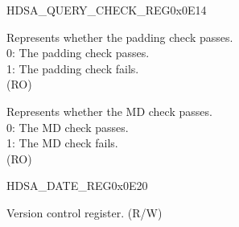 \begin{register}{H}{DSA\_QUERY\_CHECK\_REG}{0x0E14}\label{regdesc:DSAQUERYCHECKREG}
%
%
%
\regnewline%
\begin{regdesc}\begin{reglist}
\item [DSA\_PADDING\_BAD] Represents whether the padding check passes.\\
0: The padding check passes.\\
1: The padding check fails.\\
(RO)
\item [DSA\_MD\_ERROR] Represents whether the MD check passes.\\
0: The MD check passes.\\
1: The MD check fails.\\
(RO)
\end{reglist}\end{regdesc}
\end{register}




\begin{register}{H}{DSA\_DATE\_REG}{0x0E20}\label{regdesc:DSADATEREG}
%
%
\regnewline%
\begin{regdesc}\begin{reglist}
\item [DSA\_DATE] Version control register. (R/W)
\end{reglist}\end{regdesc}
\end{register}
